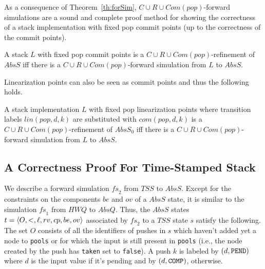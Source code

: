 
As a consequence of Theorem~\ref{th:forSim}, $C\cup R\cup Com(pop)$-forward simulations are a sound and complete proof method for showing the correctness of a stack implementation with fixed pop commit points (up to the correctness of the commit points). 


\vspace{-1.5mm}
\begin{corollary}
A stack $L$ with fixed pop commit points is a $C\cup R\cup Com(pop)$-refinement of $AbsS$ if{f} there is a $C\cup R\cup Com(pop)$-forward simulation from $L$ to $AbsS$.
\vspace{-1.5mm}
\end{corollary}

Linearization points can also be seen as commit points and thus the following holds.

\vspace{-1.5mm}
\begin{corollary}
A stack implementation $L$ with fixed pop linearization points where transition labels $lin(pop,d,k)$ are substituted with $com(pop,d,k)$ is a $C\cup R\cup Com(pop)$-refinement of $AbsS_0$ if{f} there is a $C\cup R\cup Com(pop)$-forward simulation from $L$ to $AbsS$.
\vspace{-1.5mm}
\end{corollary}


\vspace{-6mm}
\subsection{A Correctness Proof For Time-Stamped Stack}\label{sec:corr_tss}
\vspace{-1mm}
We describe a forward simulation $\mathit{fs}_2$ from $\mathit{TSS}$ to $AbsS$. Except for the constraints on the components $be$ and $ov$ of a $AbsS$ state, it is similar to the simulation $\mathit{fs}_1$ from $\mathit{HWQ}$ to $AbsQ$. Thus, the $AbsS$ states $t=\langle {O,<,\ell,rv,cp,be,ov} \rangle$ associated by $\mathit{fs}_2$ to a $\mathit{TSS}$ state $s$ satisfy the following. The set $O$ consists of all the identifiers of pushes in $s$ which haven't added yet a node to {\tt pools} or for which the input is still present in {\tt pools} (i.e., the node created by the push has {\tt taken} set to {\tt false}). A push $k$ is labeled by $(d,{\tt PEND})$ where $d$ is the input value if it's pending and by $(d,{\tt COMP})$, otherwise. 

